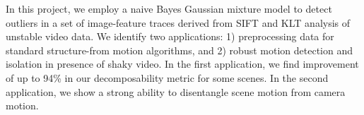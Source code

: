 In this project, we employ a naive Bayes Gaussian mixture model to detect
outliers in a set of image-feature traces derived from SIFT and KLT analysis of
unstable video data.  We identify two applications: 1) preprocessing data for
standard structure-from motion algorithms, and 2) robust motion detection and
isolation in presence of shaky video.  In the first application, we find
improvement of up to 94\% in our decomposability metric for some scenes.  In
the second application, we show a strong ability to disentangle scene motion
from camera motion.
